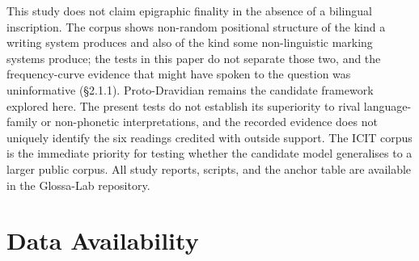 \documentclass[11pt]{article}
\begin{document}
This study does not claim epigraphic finality in the absence of a
bilingual inscription. The corpus shows non-random positional structure of the kind a writing system produces and also of the kind some non-linguistic marking systems produce; the tests in this paper do not separate those two, and the frequency-curve evidence that might have spoken to the question was uninformative (§2.1.1). Proto-Dravidian remains the candidate framework explored here. The present tests do not establish its superiority to rival language-family or non-phonetic interpretations, and the recorded evidence does not uniquely identify the six readings credited with outside support. The ICIT corpus
is the immediate
priority for testing whether the candidate model generalises to a larger public corpus. All study reports, scripts, and the anchor table are available in the Glossa-Lab repository.

\section{Data Availability}\label{data-availability}
\end{document}
